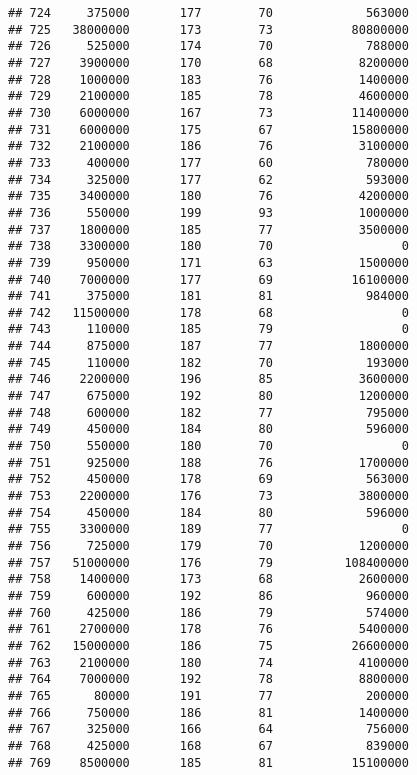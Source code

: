\documentclass[
]{article}
\begin{document}
\begin{verbatim}
## 724     375000       177        70             563000
## 725   38000000       173        73           80800000
## 726     525000       174        70             788000
## 727    3900000       170        68            8200000
## 728    1000000       183        76            1400000
## 729    2100000       185        78            4600000
## 730    6000000       167        73           11400000
## 731    6000000       175        67           15800000
## 732    2100000       186        76            3100000
## 733     400000       177        60             780000
## 734     325000       177        62             593000
## 735    3400000       180        76            4200000
## 736     550000       199        93            1000000
## 737    1800000       185        77            3500000
## 738    3300000       180        70                  0
## 739     950000       171        63            1500000
## 740    7000000       177        69           16100000
## 741     375000       181        81             984000
## 742   11500000       178        68                  0
## 743     110000       185        79                  0
## 744     875000       187        77            1800000
## 745     110000       182        70             193000
## 746    2200000       196        85            3600000
## 747     675000       192        80            1200000
## 748     600000       182        77             795000
## 749     450000       184        80             596000
## 750     550000       180        70                  0
## 751     925000       188        76            1700000
## 752     450000       178        69             563000
## 753    2200000       176        73            3800000
## 754     450000       184        80             596000
## 755    3300000       189        77                  0
## 756     725000       179        70            1200000
## 757   51000000       176        79          108400000
## 758    1400000       173        68            2600000
## 759     600000       192        86             960000
## 760     425000       186        79             574000
## 761    2700000       178        76            5400000
## 762   15000000       186        75           26600000
## 763    2100000       180        74            4100000
## 764    7000000       192        78            8800000
## 765      80000       191        77             200000
## 766     750000       186        81            1400000
## 767     325000       166        64             756000
## 768     425000       168        67             839000
## 769    8500000       185        81           15100000

\end{verbatim}
\end{document}
